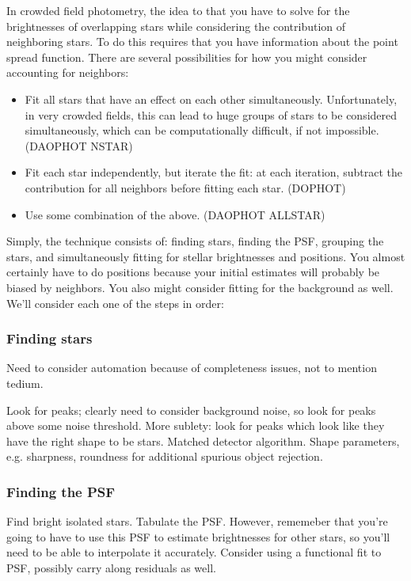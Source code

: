 \documentclass[12pt]{article}
\begin{document}
In crowded field photometry, the idea to that you have to solve for
the brightnesses of overlapping stars while considering the
contribution of neighboring stars. To do this requires that you have
information about the point spread function. There are several
possibilities for how you might consider accounting for neighbors:
\begin{itemize}
    \item Fit all stars that have an effect on each other simultaneously.
        Unfortunately, in very crowded fields, this can lead to huge groups of
        stars to be considered simultaneously, which can be computationally
        difficult, if not impossible. (DAOPHOT NSTAR)
    \item Fit each star independently, but iterate the fit: at each iteration,
        subtract the contribution for all neighbors before fitting each star.
        (DOPHOT)
    \item Use some combination of the above. (DAOPHOT ALLSTAR)
\end{itemize}
Simply, the technique consists of: finding stars, finding the PSF,
grouping the stars, and simultaneously fitting for stellar
brightnesses and positions. You almost certainly have to do positions
because your initial estimates will probably be biased by neighbors.
You also might consider fitting for the background as well. We'll
consider each one of the steps in order:

\subsubsection{Finding stars}
Need to consider automation because of completeness issues, not to
mention tedium.

Look for peaks; clearly need to consider background noise, so look for
peaks above some noise threshold. More sublety: look for peaks which
look like they have the right shape to be stars. Matched detector
algorithm. Shape parameters, e.g. sharpness, roundness for additional
spurious object rejection.

\subsubsection{Finding the PSF}
Find bright isolated stars. Tabulate the PSF. However, rememeber that
you're going to have to use this PSF to estimate brightnesses for
other stars, so you'll need to be able to interpolate it accurately.
Consider using a functional fit to PSF, possibly carry along residuals
as well.
\end{document}

